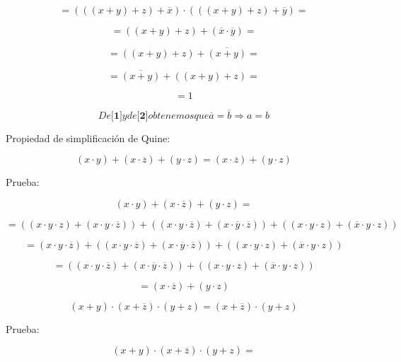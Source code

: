 \[{= {{({{({{({x + y})} + z})} + \overline{x}})} \cdot {({{({{({x + y})} + z})} + \overline{y}})}}} =\]

\[{= {{({{({x + y})} + z})} + {({\overline{x} \cdot \overline{y}})}}} =\]

\[{= {{({{({x + y})} + z})} + \overline{({x+y})}}} =\]

\[{= {\overline{({x+y})} + {({{({x + y})} + z})}}} =\]

\[= 1\]

\[\mathit{De}{\lbrack\mathbf{1}\rbrack}y\mathit{de}{\lbrack\mathbf{2}\rbrack}\mathit{obtenemos}\mathit{que}{}{}{}{\overline{a} = \overline{b}}{}\Rightarrow{}{a = b}\]

Propiedad de simplificación de Quine:

\[{{\left( {x \cdot y} \right) + \left( {x \cdot \overline{z}} \right)} + \left( {y \cdot z} \right)} = {\left( {x \cdot \overline{z}} \right) + \left( {y \cdot z} \right)}\]

Prueba:

\[{{\left( {x \cdot y} \right) + \left( {x \cdot \overline{z}} \right)} + \left( {y \cdot z} \right)} =\]

\[{} = {{\left( {\left( {{x \cdot y} \cdot z} \right) + \left( {{x \cdot y} \cdot \overline{z}} \right)} \right) + \left( {\left( {{x \cdot y} \cdot \overline{z}} \right) + \left( {{x \cdot \overline{y}} \cdot \overline{z}} \right)} \right)} + \left( {\left( {{x \cdot y} \cdot z} \right) + \left( {{\overline{x} \cdot y} \cdot z} \right)} \right)}\]

\[{} = {{\left( {{x \cdot y} \cdot \overline{z}} \right) + \left( {\left( {{x \cdot y} \cdot \overline{z}} \right) + \left( {{x \cdot \overline{y}} \cdot \overline{z}} \right)} \right)} + \left( {\left( {{x \cdot y} \cdot z} \right) + \left( {{\overline{x} \cdot y} \cdot z} \right)} \right)}\]

\[{} = {\left( {\left( {{x \cdot y} \cdot \overline{z}} \right) + \left( {{x \cdot \overline{y}} \cdot \overline{z}} \right)} \right) + \left( {\left( {{x \cdot y} \cdot z} \right) + \left( {{\overline{x} \cdot y} \cdot z} \right)} \right)}\]

\[{} = {\left( {x \cdot \overline{z}} \right) + \left( {y \cdot z} \right)}\]

\[{{\left( {x + y} \right) \cdot \left( {x + \overline{z}} \right)} \cdot \left( {y + z} \right)} = {\left( {x + \overline{z}} \right) \cdot \left( {y + z} \right)}\]

Prueba:

\[{{\left( {x + y} \right) \cdot \left( {x + \overline{z}} \right)} \cdot \left( {y + z} \right)} =\]

